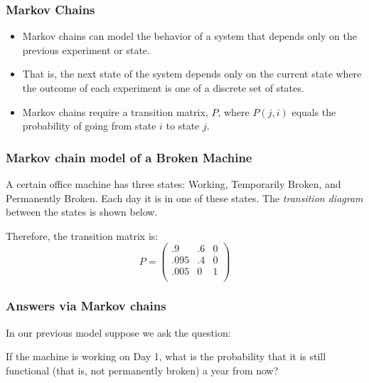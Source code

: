 \documentclass[10pt]{beamer}
\begin{document}
\begin{frame}
\frametitle{Markov Chains}
\begin{itemize}
\item Markov chains can model the behavior of a system that
depends only on the previous experiment or state.
\item That is, the next state of the system depends only on the
current state where the outcome of each experiment is one of a
discrete set of states.
\item Markov chains require a transition matrix, $P$, where
$P(j,i)$ equals the probability of going from state $i$ to state
$j$.
\end{itemize}
\end{frame}
\begin{frame}
\frametitle{Markov chain model of a Broken Machine}

A certain office machine has three states:  Working, Temporarily
Broken, and Permanently Broken.   Each day it is in one of these
states.  The \emph{transition diagram} between the states is shown
below.


Therefore, the transition matrix is:
$$P =
\left(%
\begin{array}{lll}
  .9 & .6 & 0 \\
  .095 & .4 & 0 \\
  .005 & 0 & 1 \\
\end{array}%
\right)
$$
\end{frame}
\begin{frame}
\frametitle{Answers via Markov chains}

In our previous model suppose we ask the question:

\begin{block}{}
If the machine is working on Day 1, what is the probability that
it is still functional (that is, not permanently broken) a year
from now?
\end{block}

\end{frame}
\end{document}
